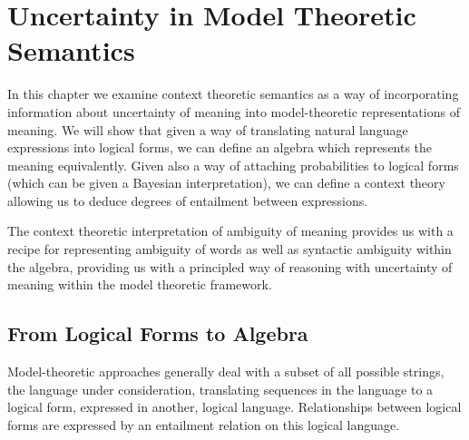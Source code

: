 
%

%


\chapter{Uncertainty in Model Theoretic Semantics}

In this chapter we examine context theoretic semantics as a way of incorporating information about uncertainty of meaning into model-theoretic representations of meaning. We will show that given a way of translating natural language expressions into logical forms, we can define an algebra which represents the meaning equivalently. Given also a way of attaching probabilities to logical forms (which can be given a Bayesian interpretation), we can define a context theory allowing us to deduce degrees of entailment between expressions.

The context theoretic interpretation of ambiguity of meaning provides us with a recipe for representing ambiguity of words as well as syntactic ambiguity within the algebra, providing us with a principled way of reasoning with uncertainty of meaning within the model theoretic framework.

\section{From Logical Forms to Algebra}

Model-theoretic approaches generally deal with a subset of all possible strings, the language under consideration, translating sequences in the language to a logical form, expressed in another, logical language. Relationships between logical forms are expressed by an entailment relation on this logical language.


